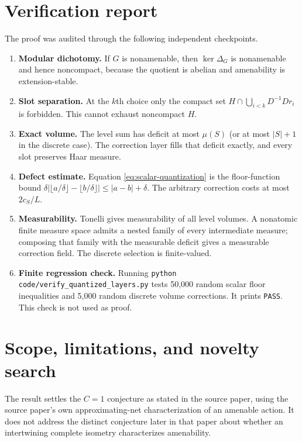 \documentclass[11pt]{article}
\newcommand{\1}{\mathbf 1}
\begin{document}
\section{Verification report}

The proof was audited through the following independent checkpoints.

\begin{enumerate}[leftmargin=*]
\item \textbf{Modular dichotomy.}  If $G$ is nonamenable, then
$\ker\Delta_G$ is nonamenable and hence noncompact, because the quotient is
abelian and amenability is extension-stable.
\item \textbf{Slot separation.}  At the $k$th choice only the compact set
$H\cap\bigcup_{i<k}D^{-1}Dr_i$ is forbidden.  This cannot exhaust noncompact
$H$.
\item \textbf{Exact volume.}  The level sum has deficit at most $\mu(S)$
(or at most $|S|+1$ in the discrete case).  The correction layer fills that
deficit exactly, and every slot preserves Haar measure.
\item \textbf{Defect estimate.}  Equation \eqref{eq:scalar-quantization}
is the floor-function bound
$\delta|\lfloor a/\delta\rfloor-\lfloor b/\delta\rfloor|
\leq |a-b|+\delta$.  The arbitrary correction costs at most $2c_S/L$.
\item \textbf{Measurability.}  Tonelli gives measurability of all level
volumes.  A nonatomic finite measure space admits a nested family of every
intermediate measure; composing that family with the measurable deficit gives
a measurable correction field.  The discrete selection is finite-valued.
\item \textbf{Finite regression check.}  Running
\texttt{python code/verify\_quantized\_layers.py} tests 50,000 random scalar
floor inequalities and 5,000 random discrete volume corrections.  It prints
\texttt{PASS}.  This check is not used as proof.
\end{enumerate}

\section{Scope, limitations, and novelty search}

The result settles the $C=1$ conjecture as stated in the source paper, using
the source paper's own approximating-net characterization of an amenable
action.  It does not address the distinct conjecture later in that paper about
whether an intertwining complete isometry characterizes amenability.
\end{document}
